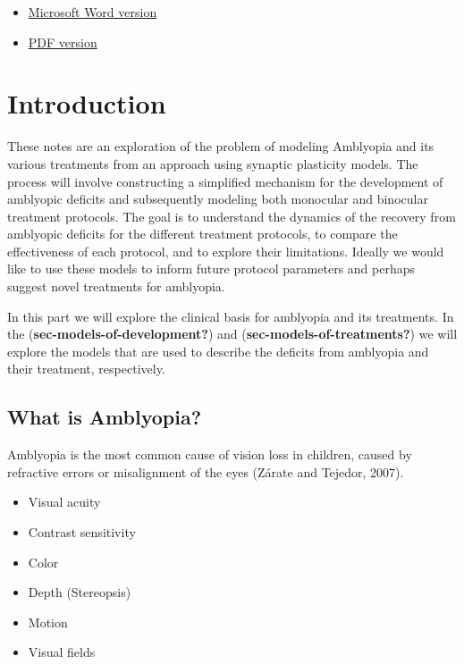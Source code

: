 \documentclass[
  onecolumn]{article}
\providecommand{\tightlist}{%
  \setlength{\itemsep}{0pt}\setlength{\parskip}{0pt}}
\begin{document}
\begin{itemize}
\tightlist
\item
  \href{}{Microsoft Word version}
\item
  \href{}{PDF version}
\end{itemize}

\hypertarget{introduction}{%
\section{Introduction}\label{introduction}}

These notes are an exploration of the problem of modeling Amblyopia and
its various treatments from an approach using synaptic plasticity
models. The process will involve constructing a simplified mechanism for
the development of amblyopic deficits and subsequently modeling both
monocular and binocular treatment protocols. The goal is to understand
the dynamics of the recovery from amblyopic deficits for the different
treatment protocols, to compare the effectiveness of each protocol, and
to explore their limitations. Ideally we would like to use these models
to inform future protocol parameters and perhaps suggest novel
treatments for amblyopia.

In this part we will explore the clinical basis for amblyopia and its
treatments. In the (\textbf{sec-models-of-development?}) and
(\textbf{sec-models-of-treatments?}) we will explore the models that are
used to describe the deficits from amblyopia and their treatment,
respectively.

\hypertarget{what-is-amblyopia}{%
\subsection{What is Amblyopia?}\label{what-is-amblyopia}}

Amblyopia is the most common cause of vision loss in children, caused by
refractive errors or misalignment of the eyes (Zárate and Tejedor,
2007).

\begin{itemize}
\tightlist
\item
  Visual acuity
\item
  Contrast sensitivity
\item
  Color
\item
  Depth (Stereopsis)
\item
  Motion
\item
  Visual fields
\end{itemize}
\end{document}
